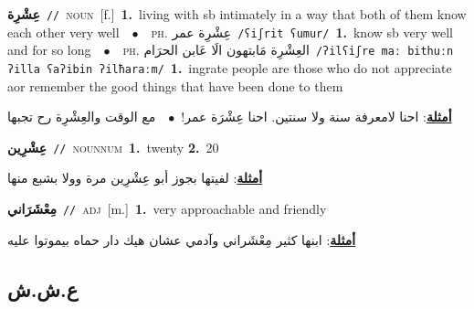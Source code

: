 \documentclass[10pt,a4paper,twoside]{article} %
\begin{document}
\begin{multicols}{2}
{\setlength\topsep{0pt}\textbf{\foreignlanguage{arabic}{عِشْرِة}}\ {\color{gray}\texttt{//}\color{black}}\ \textsc{noun}\ [f.]\ \textbf{1.}~living with sb intimately in a way that both of them know each other very well\ \ $\bullet$\ \ \textsc{ph.} \color{gray} \foreignlanguage{arabic}{عِشْرِة عمر}\color{black}\ {\color{gray}\texttt{/{\sffamily ʕiʃrit ʕumur}/}\color{black}}\ \textbf{1.}~know sb very well and for so long\ \ $\bullet$\ \ \textsc{ph.} \color{gray} \foreignlanguage{arabic}{العِشْرِة مَابتهون الَا عَابن الحرَام}\color{black}\ {\color{gray}\texttt{/{\sffamily ʔilʕiʃre maː bithuːn ʔilla ʕaʔibin ʔilħaraːm}/}\color{black}}\ \textbf{1.}~ingrate people are those who do not appreciate aor remember the good things that have been done to them\  \begin{flushright}\color{gray}\foreignlanguage{arabic}{\textbf{\underline{\foreignlanguage{arabic}{أمثلة}}}: احنا لامعرفة سنة ولا سنتين. احنا عِشْرَة عمر!\ $\bullet$\ \  مع الوقت والعِشْرِة رح تجبها}\end{flushright}\color{black}} \vspace{2mm}

{\setlength\topsep{0pt}\textbf{\foreignlanguage{arabic}{عِشْرِين}}\ {\color{gray}\texttt{//}\color{black}}\ \textsc{noun\textunderscore num}\ \textbf{1.}~twenty  \textbf{2.}~20\  \begin{flushright}\color{gray}\foreignlanguage{arabic}{\textbf{\underline{\foreignlanguage{arabic}{أمثلة}}}: لفيتها بجوز أبو عِشْرِين مرة وولا بشبع منها}\end{flushright}\color{black}} \vspace{2mm}

{\setlength\topsep{0pt}\textbf{\foreignlanguage{arabic}{مِعْشَرَاني}}\ {\color{gray}\texttt{//}\color{black}}\ \textsc{adj}\ [m.]\ \textbf{1.}~very approachable and friendly\  \begin{flushright}\color{gray}\foreignlanguage{arabic}{\textbf{\underline{\foreignlanguage{arabic}{أمثلة}}}: ابنها كثير مِعْشَراني وآدمي عشان هيك دار حماه بيموتوا عليه}\end{flushright}\color{black}} \vspace{2mm}

\vspace{-3mm}
\subsection*{\color{blue}\foreignlanguage{arabic}{ع.ش.ش}\color{blue}{}} 


\end{multicols}
\end{document}
